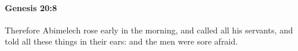 
		\paragraph{Genesis 20:8} %
			\label{GENESIS-20-8}

			Therefore Abimelech rose early in the morning, and called all his servants, and told all these things in their ears: and the men were sore afraid.


